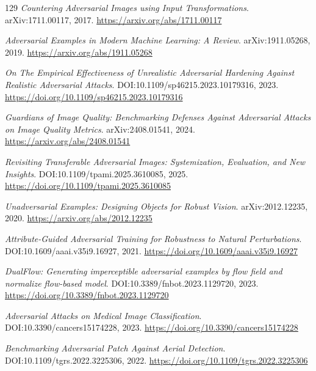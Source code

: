 \documentclass[11pt,a4paper]{article}
\begin{document}
\begin{thebibliography}{129}
\newblock \emph{Countering Adversarial Images using Input Transformations}.
\newblock arXiv:1711.00117, 2017.
\newblock \url{https://arxiv.org/abs/1711.00117}

\newblock \emph{Adversarial Examples in Modern Machine Learning: A Review}.
\newblock arXiv:1911.05268, 2019.
\newblock \url{https://arxiv.org/abs/1911.05268}

\newblock \emph{On The Empirical Effectiveness of Unrealistic Adversarial Hardening Against Realistic Adversarial Attacks}.
\newblock DOI:10.1109/sp46215.2023.10179316, 2023.
\newblock \url{https://doi.org/10.1109/sp46215.2023.10179316}

\newblock \emph{Guardians of Image Quality: Benchmarking Defenses Against Adversarial Attacks on Image Quality Metrics}.
\newblock arXiv:2408.01541, 2024.
\newblock \url{https://arxiv.org/abs/2408.01541}

\newblock \emph{Revisiting Transferable Adversarial Images: Systemization, Evaluation, and New Insights}.
\newblock DOI:10.1109/tpami.2025.3610085, 2025.
\newblock \url{https://doi.org/10.1109/tpami.2025.3610085}

\newblock \emph{Unadversarial Examples: Designing Objects for Robust Vision}.
\newblock arXiv:2012.12235, 2020.
\newblock \url{https://arxiv.org/abs/2012.12235}

\newblock \emph{Attribute-Guided Adversarial Training for Robustness to Natural Perturbations}.
\newblock DOI:10.1609/aaai.v35i9.16927, 2021.
\newblock \url{https://doi.org/10.1609/aaai.v35i9.16927}

\newblock \emph{DualFlow: Generating imperceptible adversarial examples by flow field and normalize flow-based model}.
\newblock DOI:10.3389/fnbot.2023.1129720, 2023.
\newblock \url{https://doi.org/10.3389/fnbot.2023.1129720}

\newblock \emph{Adversarial Attacks on Medical Image Classification}.
\newblock DOI:10.3390/cancers15174228, 2023.
\newblock \url{https://doi.org/10.3390/cancers15174228}

\newblock \emph{Benchmarking Adversarial Patch Against Aerial Detection}.
\newblock DOI:10.1109/tgrs.2022.3225306, 2022.
\newblock \url{https://doi.org/10.1109/tgrs.2022.3225306}


\end{thebibliography}
\end{document}
